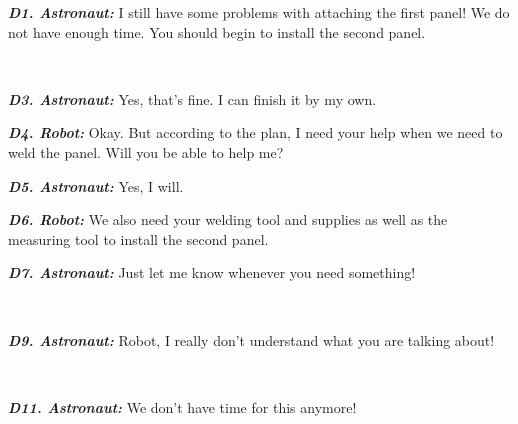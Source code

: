 \begin{description}
  \item \textit{\textbf{D1. Astronaut:}} I still have some problems with
  attaching the first panel! We do not have enough time. You should begin to
  install the second panel.\\

  \item {}\\
  
  \item \textit{\textbf{D3. Astronaut:}} Yes, that's fine. I can finish it by my
  own.\\

  \item \textit{\textbf{D4. Robot:}} Okay. But according to the plan, I need
  your help when we need to weld the panel. Will you be able to help me?\\

  \item \textit{\textbf{D5. Astronaut:}} Yes, I will.\\
  
  \item \textit{\textbf{D6. Robot:}} We also need your welding tool and supplies
  as well as the measuring tool to install the second panel.\\
  
  \item \textit{\textbf{D7. Astronaut:}} Just let me know whenever you need
  something!\\
  
  \item {}\\
  
  \item \textit{\textbf{D9. Astronaut:}} Robot, I really don't understand what
  you are talking about!\\
  
  \item {}\\

  \item \textit{\textbf{D11. Astronaut:}} We don't have time for this anymore!
  
\end{description}

